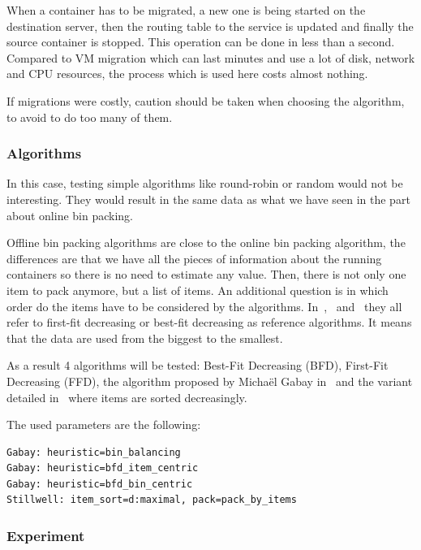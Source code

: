 When a container has to be migrated, a new one is being started on the
destination server, then the routing table to the service is updated and
finally the source container is stopped. This operation can be done in less
than a second. Compared to VM migration which can last minutes and use a lot of
disk, network and CPU resources, the process which is used here costs almost
nothing.

If migrations were costly, caution should be taken when choosing the algorithm,
to avoid to do too many of them.

\subsubsection{Algorithms}

In this case, testing simple algorithms like round-robin or random would not be
interesting. They would result in the same data as what we have seen in the part
about online bin packing.

Offline bin packing algorithms are close to the online bin packing algorithm,
the differences are that we have all the pieces of information about the
running containers so there is no need to estimate any value. Then, there is
not only one item to pack anymore, but a list of items. An additional question
is in which order do the items have to be considered by the algorithms.
In~\cite{reassignmentElectricitysaving},~\cite{statisticalAssignment}
and~\cite{variableSizeBinPacking} they all refer to first-fit decreasing or
best-fit decreasing as reference algorithms. It means that the data are used
from the biggest to the smallest.

As a result 4 algorithms will be tested: Best-Fit Decreasing (BFD), First-Fit
Decreasing (FFD), the algorithm proposed by Michaël Gabay
in~\cite{variableSizeBinPacking} and the variant detailed
in~\cite{allocationHeterogeneous} where items are sorted decreasingly.

The used parameters are the following:

\begin{verbatim}
Gabay: heuristic=bin_balancing
Gabay: heuristic=bfd_item_centric
Gabay: heuristic=bfd_bin_centric
Stillwell: item_sort=d:maximal, pack=pack_by_items
\end{verbatim}

\subsubsection{Experiment}


